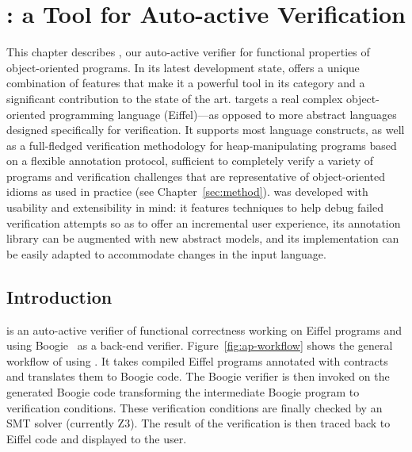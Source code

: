 \chapter{\AutoProof: a Tool for Auto-active Verification}
\label{sec:ap}


This chapter describes \AutoProof, our auto-active verifier for functional properties of object-oriented programs.
In its latest development state, \AutoProof offers a unique combination of features that make it a powerful tool in its category and a significant contribution to the state of the art.
\AutoProof targets a real complex object-oriented programming language (Eiffel)---as opposed to more abstract languages designed specifically for verification.
It supports most language constructs, as well as a full-fledged verification methodology for heap-manipulating programs based on a flexible annotation protocol, sufficient to completely verify a variety of programs and verification challenges that are representative of object-oriented idioms as used in practice (see Chapter~\ref{sec:method}).
\AutoProof was developed with usability and extensibility in mind: it features techniques to help debug failed verification attempts so as to offer an incremental user experience, its annotation library can be augmented with new abstract models, and its implementation can be easily adapted to accommodate changes in the input language.


\section{Introduction}
\label{sec:ap-intro}


\AutoProof is an auto-active verifier of functional correctness working on Eiffel programs and using Boogie~\cite{LEINO08} as a back-end verifier. Figure~\ref{fig:ap-workflow} shows the general workflow of using \AutoProof. It takes compiled Eiffel programs annotated with contracts and translates them to Boogie code. The Boogie verifier is then invoked on the generated Boogie code transforming the intermediate Boogie program to verification conditions. These verification conditions are finally checked by an SMT solver (currently Z3). The result of the verification is then traced back to Eiffel code and displayed to the user.

